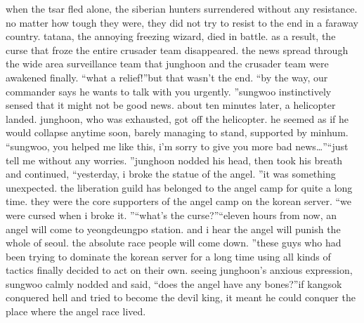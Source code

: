 when the tsar fled alone, the siberian hunters surrendered without any resistance.
 no matter how tough they were, they did not try to resist to the end in a faraway country.
tatana, the annoying freezing wizard, died in battle.
 as a result, the curse that froze the entire crusader team disappeared.
the news spread through the wide area surveillance team that junghoon and the crusader team were awakened finally.
“what a relief!”but that wasn’t the end.
“by the way, our commander says he wants to talk with you urgently.
”sungwoo instinctively sensed that it might not be good news.
 about ten minutes later, a helicopter landed.
 junghoon, who was exhausted, got off the helicopter.
 he seemed as if he would collapse anytime soon, barely managing to stand, supported by minhum.
“sungwoo, you helped me like this, i’m sorry to give you more bad news…”“just tell me without any worries.
”junghoon nodded his head, then took his breath and continued, “yesterday, i broke the statue of the angel.
”it was something unexpected.
 the liberation guild has belonged to the angel camp for quite a long time.
 they were the core supporters of the angel camp on the korean server.
“we were cursed when i broke it.
”“what’s the curse?”“eleven hours from now, an angel will come to yeongdeungpo station.
 and i hear the angel will punish the whole of seoul.
 the absolute race people will come down.
”these guys who had been trying to dominate the korean server for a long time using all kinds of tactics finally decided to act on their own.
seeing junghoon’s anxious expression, sungwoo calmly nodded and said, “does the angel have any bones?”if kangsok conquered hell and tried to become the devil king, it meant he could conquer the place where the angel race lived.


 